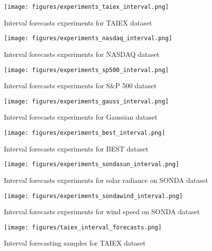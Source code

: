 \begin{figure}
\texttt{[image: figures/experiments\_taiex\_interval.png]}
\caption{Interval forecasts experiments for TAIEX dataset}
\label{fig:experiments_taiex_interval}
\end{figure}

\begin{figure}
\texttt{[image: figures/experiments\_nasdaq\_interval.png]}
\caption{Interval forecasts experiments for NASDAQ dataset}
\label{fig:experiments_nasdaq_interval}
\end{figure}

\begin{figure}
\texttt{[image: figures/experiments\_sp500\_interval.png]}
\caption{Interval forecasts experiments for S\&P 500 dataset}
\label{fig:experiments_sp500_interval}
\end{figure}

\begin{figure}
\texttt{[image: figures/experiments\_gauss\_interval.png]}
\caption{Interval forecasts experiments for Gaussian dataset}
\label{fig:experiments_gauss_interval}
\end{figure}

\begin{figure}
\texttt{[image: figures/experiments\_best\_interval.png]}
\caption{Interval forecasts experiments for BEST dataset}
\label{fig:experiments_best_interval}
\end{figure}

\begin{figure}
\texttt{[image: figures/experiments\_sondasun\_interval.png]}
\caption{Interval forecasts experiments for solar radiance on SONDA dataset}
\label{fig:experiments_sondasun_interval}
\end{figure}

\begin{figure}
\texttt{[image: figures/experiments\_sondawind\_interval.png]}
\caption{Interval forecasts experiments for wind speed on SONDA dataset}
\label{fig:experiments_sondawind_interval}
\end{figure}

\begin{figure}
\texttt{[image: figures/taiex\_interval\_forecasts.png]}
\caption{Interval forecasting samples for TAIEX dataset}
\label{fig:taiex_interval_forecasts}
\end{figure}

